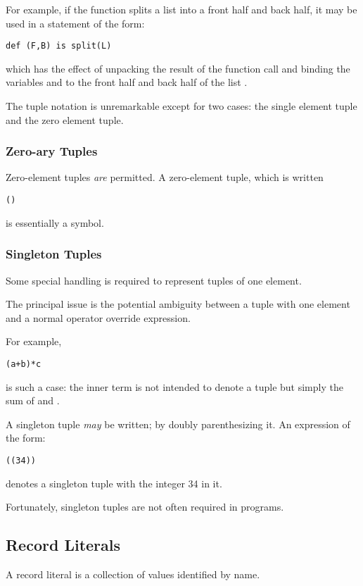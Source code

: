 For example, if the  function splits a list into a front half and back half, it may be used in a statement of the form:
\begin{lstlisting}
def (F,B) is split(L)
\end{lstlisting}
which has the effect of unpacking the result of the  function call and binding the variables  and  to the front half and back half of the list . 


The tuple notation is unremarkable except for two cases: the single element tuple and the zero element tuple.


\subsubsection{Zero-ary Tuples}
\label{zeroTuple}
Zero-element tuples \emph{are} permitted. A zero-element tuple, which is written
\begin{lstlisting}
()
\end{lstlisting}
is essentially a symbol.

\subsubsection{Singleton Tuples}
Some special handling is required to represent tuples of one element.

The principal issue is the potential ambiguity between a tuple with one element and a normal operator override expression.

For example,
\begin{lstlisting}
(a+b)*c
\end{lstlisting}
is such a case: the inner term  is not intended to denote a tuple but simply the sum of  and .

A singleton tuple \emph{may} be written; by doubly parenthesizing it. An expression of the form:
\begin{lstlisting}
((34))
\end{lstlisting}
denotes a singleton tuple with the integer 34 in it.

\begin{aside}
Fortunately, singleton tuples are not often required in programs. 
\end{aside}

\subsection{Record Literals}
\label{recordLiteral}
A record literal is a collection of values identified by name.

